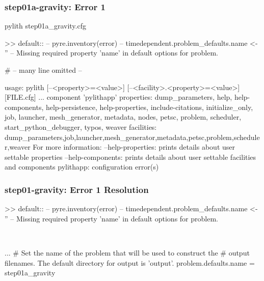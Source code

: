 \documentclass[aspectratio=169]{beamer}
\begin{document}
\begin{frame}[fragile]
  \frametitle{{\ttfamily step01a-gravity}: Error 1}

\begin{bashcode}
pylith step01a_gravity.cfg

 >> {default}::
 -- pyre.inventory(error)
 -- timedependent.problem_defaults.name <- ''
 -- Missing required property 'name' in default options for problem.

  # -- many line omitted --

usage: pylith [--<property>=<value>] [--<facility>.<property>=<value>] [FILE.cfg] ...
component 'pylithapp'
    properties: dump_parameters, help, help-components, help-persistence, help-properties, include-citations, initialize_only, job, launcher, mesh_generator, metadata, nodes, petsc, problem, scheduler, start_python_debugger, typos, weaver
    facilities: dump_parameters,job,launcher,mesh_generator,metadata,petsc,problem,scheduler,weaver
For more information:
  --help-properties: prints details about user settable properties
  --help-components: prints details about user settable facilities and components
pylithapp: configuration error(s)
\end{bashcode}

\end{frame}


\begin{frame}[t,fragile]
  \frametitle{{\ttfamily step01-gravity}: Error 1 Resolution}

  \tserror
  \begin{bashcode}
    >> {default}::
    -- pyre.inventory(error)
    -- timedependent.problem_defaults.name <- ''
    -- Missing required property 'name' in default options for problem.
  \end{bashcode}

  \pause\\[1pt]

  \begin{cfgcode}
    [pylithapp]
    ...
    # Set the name of the problem that will be used to construct the
    # output filenames. The default directory for output is 'output'.
    problem.defaults.name = step01a_gravity
  \end{cfgcode}

\end{frame}
\end{document}
